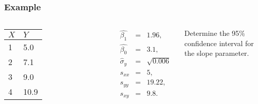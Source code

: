 \begin{frame}
  \frametitle{Example}

    \begin{columns}

      \begin{tabular}{l|l}
        $X$ & $Y$ \\ \hline
        1 & 5.0 \\
        2 & 7.1 \\
        3 & 9.0 \\
        4 & 10.9 \\
      \end{tabular}


      \begin{eqnarray*}
        \hat{\beta_1} & = & 1.96, \\
        \hat{\beta_0} & = & 3.1, \\
        \hat{\sigma}_y & = & \sqrt{0.006} \\
        s_{xx} & = & 5, \\
        s_{yy} & = & 19.22, \\
        s_{xy} & = & 9.8. 
      \end{eqnarray*}



      Determine the 95\% confidence interval for the slope parameter.

    \end{columns}

    \vfill


\end{frame}


